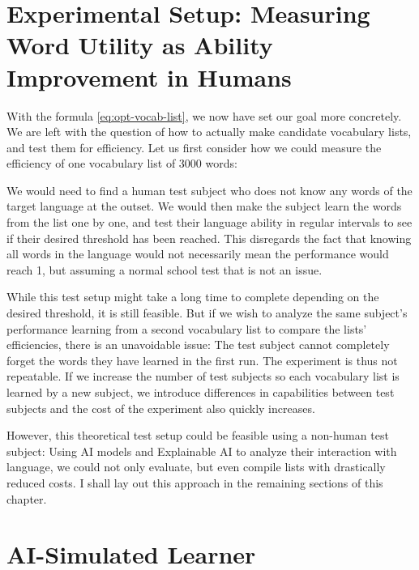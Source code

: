 \section{Experimental Setup: Measuring Word Utility as Ability Improvement in Humans} \label{seq:human-efficiency-testing}


With the formula \ref{eq:opt-vocab-list}, we now have set our goal more concretely.
We are left with the question of how to actually make candidate vocabulary lists, and test them for efficiency.
Let us first consider how we could measure the efficiency of one vocabulary list of 3000 words:

We would need to find a human test subject who does not know any words of the target language at the outset.
We would then make the subject learn the words from the list one by one, and test their language ability in regular intervals to see if their desired threshold has been reached.
This disregards the fact that knowing all words in the language would not necessarily mean the performance would reach 1, but assuming a normal school test that is not an issue.

While this test setup might take a long time to complete depending on the desired threshold, it is still feasible.
But if we wish to analyze the same subject's performance learning from a second vocabulary list to compare the lists' efficiencies, there is an unavoidable issue:
The test subject cannot completely forget the words they have learned in the first run.
The experiment is thus not repeatable.
If we increase the number of test subjects so each vocabulary list is learned by a new subject, we introduce differences in capabilities between test subjects and the cost of the experiment also quickly increases.

However, this theoretical test setup could be feasible using a non-human test subject:
Using AI models and Explainable AI to analyze their interaction with language, we could not only evaluate, but even compile lists with drastically reduced costs.
I shall lay out this approach in the remaining sections of this chapter.

\section{AI-Simulated Learner}

